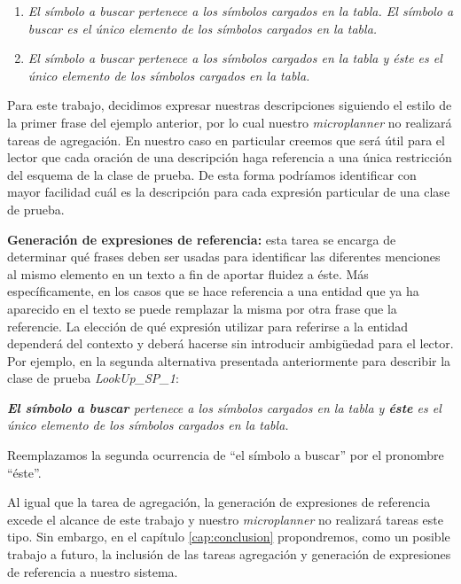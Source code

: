 \begin{center}
\begin{enumerate}
  \item \emph{El símbolo a buscar pertenece a los símbolos cargados en la tabla. El símbolo a buscar es el único elemento de los símbolos cargados en la tabla.} 
  \item \emph{El símbolo a buscar pertenece a los símbolos cargados en la tabla y éste es el único elemento de los símbolos cargados en la tabla.}
\end{enumerate}
\end{center}

\medskip
\noindent
Para este trabajo, decidimos expresar nuestras descripciones siguiendo el estilo de la primer frase del ejemplo anterior, por lo cual nuestro \textit{microplanner} no realizará tareas de agregación. En nuestro caso en particular creemos que será útil para el lector que cada oración de una descripción haga referencia a una única restricción del esquema de la clase de prueba. De esta forma podríamos identificar con mayor facilidad cuál es la descripción para cada expresión particular de una clase de prueba.


\medskip
\noindent
\textbf{Generación de expresiones de referencia:} esta tarea se encarga de determinar qué frases deben ser usadas para identificar las diferentes menciones al mismo elemento en un texto a fin de aportar fluidez a éste. Más específicamente, en los casos que se hace referencia a una entidad que ya ha aparecido en el texto se puede remplazar la misma por otra frase que la referencie. La elección de qué expresión utilizar para referirse a la entidad dependerá del contexto y deberá hacerse sin introducir ambigüedad para el lector. Por ejemplo, en la segunda alternativa presentada anteriormente para describir la clase de prueba \emph{LookUp\_SP\_1}:

\begin{center}
 \emph{\textbf{El símbolo a buscar} pertenece a los símbolos cargados en la tabla y \textbf{éste} es el único elemento de los símbolos cargados en la tabla.}
\end{center}

\noindent
Reemplazamos la segunda ocurrencia de ``el símbolo a buscar'' por el pronombre ``éste''.

\smallskip
Al igual que la tarea de agregación, la generación de expresiones de referencia excede el alcance de este trabajo y  nuestro \textit{microplanner} no realizará tareas este tipo. Sin embargo, en el capítulo \ref{cap:conclusion} propondremos, como un posible trabajo a futuro, la inclusión de las tareas agregación y generación de expresiones de referencia a nuestro sistema. 

